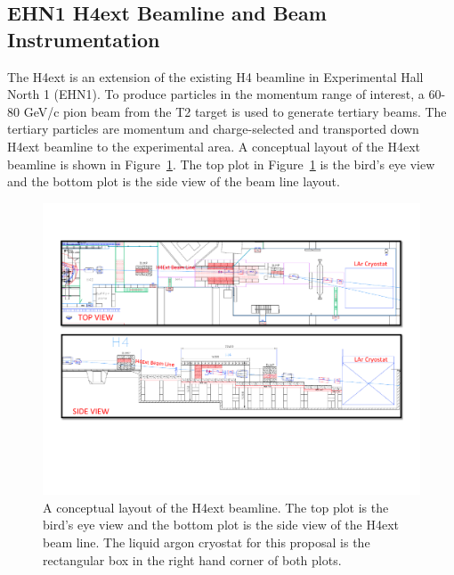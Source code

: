 \subsection{EHN1 H4ext Beamline and Beam Instrumentation}
The H4ext is an extension of the existing H4 beamline in Experimental Hall North 1 (EHN1).  To produce particles in the momentum range of interest, a 60-80 GeV/c pion beam from the T2 target is used to generate tertiary beams. The tertiary particles are momentum and charge-selected and transported down H4ext beamline to the experimental area. A conceptual layout of the H4ext beamline is shown in Figure~\ref{fig:H4extPrelim}.  The top plot in Figure~\ref{fig:H4extPrelim} is the bird's eye view and the bottom plot is the side view of the beam line layout.

\begin{figure}[h]
  \centering
\includegraphics[scale=0.62]{figures/EHN1_H4ext.pdf}
  \caption{A conceptual layout of the H4ext beamline. The top plot is the bird's eye view and the bottom plot is the side view of the H4ext beam line. The liquid argon cryostat for this proposal is the rectangular box in the right hand corner of both plots.  }
  \label{fig:H4extPrelim}
\end{figure}


